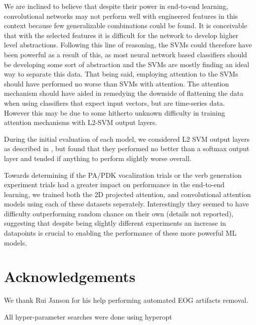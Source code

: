 \documentclass[utf8]{frontiersSCNS} %
\begin{document}
We are inclined to believe that despite their power in end-to-end learning, convolutional networks may not perform well with engineered features in this context because few generalizable combinations could be found. It is conceivable that with the selected features it is difficult for the network to develop higher level abstractions. Following this line of reasoning, the SVMs could therefore have been powerful as a result of this, as most neural network based classifiers should be developing some sort of abstraction and the SVMs are mostly finding an ideal way to separate this data. That being said, employing attention to the SVMs should have performed no worse than SVMs with attention. The attention mechanism should have aided in remedying the downside of flattening the data when using classifiers that expect input vectors, but are time-series data. However this may be due to some hitherto unknown difficulty in training attention mechanisms with L2-SVM output layers.

During the initial evaluation of each model, we considered L2 SVM output layers as described in \cite{l2svmuoftpaper}, but found that they performed no better than a softmax output layer and tended if anything to perform slightly worse overall.

Towards determining if the PA/PDK vocalization trials or the verb generation experiment trials had a greater impact on performance in the end-to-end learning, we trained both the 2D projected attention, and convolutional attention models using each of these datasets seperately. Interestingly they seemed to have difficulty outperforming random chance on their own (details not reported), suggesting that despite being slightly different experiments an increase in datapoints is crucial to enabling the performance of these more powerful ML models.

\section{Acknowledgements}

We thank Rui Janson for his help performing automated EOG artifacts removal.


All hyper-parameter searches were done using hyperopt \cite{Bergstra2013}


\end{document}
